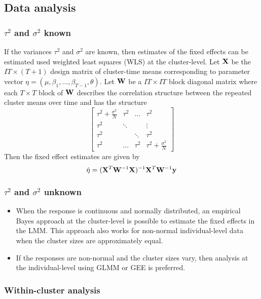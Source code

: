 \documentclass{article}
\newcommand{\bfW}{{\bf W}}
\newcommand{\bfX}{{\bf X}}
\newcommand{\bfy}{{\bf y}}
\begin{document}
\subsection{Data analysis}

\subsubsection{$\tau^2$ and $\sigma^2$ known}

If the variances $\tau^2$ and $\sigma^2$ are known, then estimates of the fixed effects can be estimated used weighted least squares (WLS) at the cluster-level. Let $\bfX$ be the $IT\times(T+1)$ design matrix of cluster-time means corresponding to parameter vector $\eta=(\mu,\beta_1,\ldots,\beta_{T-1},\theta)$. Let $\bfW$ be a $IT\times IT$ block diagonal matrix where each $T\times T$ block of $\bfW$ describes the correlation structure between the repeated cluster means over time and has the structure
\[
\begin{bmatrix}
\tau^2 + \frac{\sigma^2}{N} & \tau^2 & \ldots & \tau^2 \\
\tau^2 & \ddots & & \vdots \\
\tau^2 & & \ddots & \tau^2 \\
\tau^2 & \ldots & \tau^2 & \tau^2 + \frac{\sigma^2}{N}
\end{bmatrix}
\]
Then the fixed effect estimates are given by
\[
\hat{\eta} = (\bfX^T\bfW^{-1}\bfX)^{-1}\bfX^T\bfW^{-1}\bfy
\]

\subsubsection{$\tau^2$ and $\sigma^2$ unknown}

\begin{itemize}

\item
When the response is continuous and normally distributed, an empirical Bayes approach at the cluster-level is possible to estimate the fixed effects in the LMM. This approach also works for non-normal individual-level data when the cluster sizes are approximately equal.

\item
If the responses are non-normal and the cluster sizes vary, then analysis at the individual-level using GLMM or GEE is preferred.

\end{itemize}

\subsubsection{Within-cluster analysis}
\end{document}
